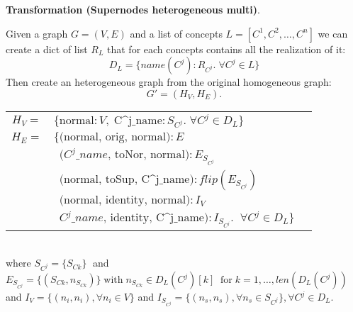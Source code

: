 \documentclass[twoside,11pt]{article}
\begin{document}
\noindent
{\bf Transformation (Supernodes heterogeneous multi)}.
{
    Given a graph \( G = (V,E) \) and a list of concepts \( L = [C^1, C^2, \ldots, C^n] \) we can create a dict of list \( R_{L} \) that for each concepts contains all the realization of it:
\[
    D_L = \{ name(C^j) : R_{C^j}. \; \forall C^j \in L\}
\]
Then create an heterogeneous graph from the original homogeneous graph:\[
    G'=(H_V, H_E)
.\]
\begin{tabular}{cll}
    \( H_V = \) &  \( \{\textrm{normal}:V,\; \textrm{C^j\_name}:S_{C^j}. \; \forall C^j \in D_L\} \) \\
    \( H_E = \) &  \( \{\textrm{(normal, orig, normal)} : E \) \\
                & \( \,\,\, (C^j\_name\textrm{, toNor, normal)} : E_{S_{C^j}} \) \\
                & \( \,\,\, \textrm{(normal, toSup, C^j\_name)} : flip(E_{S_{C^j}}) \) \\
              & \( \,\,\, \textrm{(normal, identity, normal)} : I_V \) \\
              & \( \,\,\, C^j\_name\textrm{, identity, C^j\_name)} : I_{S_{C^j}}. \;\; \forall C^j \in D_L \}\) \\
\end{tabular}\\

\noindent
where \( S_{C^j} = \{S_{Ck} \} \; \) and \( E_{S_{C^j}} = \{ (S_{Ck}, n_{S_{Ck}})  \} \; \textrm{with} \; n_{S_{Ck}} \in D_L(C^j)[k] \;\; \textrm{for} \; k = 1, \ldots, len(D_L(C^j)) \)
and \( I_V = \{(n_i, n_i), \forall n_i \in V\} \) and \( I_{S_{C^j}} = \{(n_s, n_s), \forall n_s \in S_{C^j} \} , \forall C^j \in D_L\).
}

\end{document}
